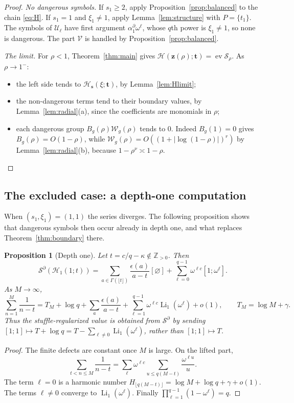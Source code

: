 \documentclass[11pt]{amsart}
\newtheorem{proposition}[theorem]{Proposition}
\theoremstyle{definition}
\theoremstyle{remark}
\numberwithin{equation}{section}
\newcommand{\Z}{\mathbb{Z}}
\newcommand{\Li}{\operatorname{Li}}
\newcommand{\ev}{\operatorname{ev}}
\newcommand{\cS}{\mathcal{S}}
\newcommand{\s}{\mathbf{s}}
\newcommand{\z}{\mathbf{z}}
\newcommand{\tb}{\mathbf{t}}
\newcommand{\Hs}{\mathcal{H}}
\newcommand{\lfl}{\lfloor}
\newcommand{\rfl}{\rfloor}
\begin{document}
\begin{proof}
\emph{No dangerous symbols.} If $s_1\ge2$, apply Proposition~\ref{prop:balanced} to the chain \eqref{eq:H}. If $s_1=1$ and $\xi_1\ne1$, apply Lemma~\ref{lem:structure} with $P=\{t_1\}$. The symbols of $\mathcal U_\ell$ have first argument $\alpha_1^\partial\omega^\ell$, whose $q$th power is $\xi_1\ne1$, so none is dangerous. The part $\mathcal V$ is handled by Proposition~\ref{prop:balanced}.

\emph{The limit.} For $\rho<1$, Theorem~\ref{thm:main} gives $\Hs(\z(\rho);\tb)=\ev\cS_\rho$. As $\rho\to1^-$:
\begin{itemize}[leftmargin=1.5em]
\item the left side tends to $\Hs_\s(\xi;\tb)$, by Lemma~\ref{lem:Hlimit};
\item the non-dangerous terms tend to their boundary values, by Lemma~\ref{lem:radial}(a), since the coefficients are monomials in $\rho$;
\item each dangerous group $B_g(\rho)\mathcal W_g(\rho)$ tends to $0$. Indeed $B_g(1)=0$ gives $B_g(\rho)=O(1-\rho)$, while $\mathcal W_g(\rho)=O((1+|\log(1-\rho)|)^r)$ by Lemma~\ref{lem:radial}(b), because $1-\rho^\nu\asymp1-\rho$. \qedhere
\end{itemize}
\end{proof}

\subsection{The excluded case: a depth-one computation}
When $(s_1,\xi_1)=(1,1)$ the series diverges. The following proposition shows that dangerous symbols then occur already in depth one, and what replaces Theorem~\ref{thm:boundary} there.

\begin{proposition}[Depth one]\label{prop:reg1}
Let $t=c/q-\kappa\notin\Z_{>0}$. Then
\[
\cS^\partial(\Hs_1(1;t))=\sum_{a\in\Gamma(\lfl t\rfl)}\frac{\epsilon(a)}{a-t}[\varnothing]+\sum_{\ell=0}^{q-1}\omega^{\ell c}[1;\omega^\ell].
\]
As $M\to\infty$,
\[
\sum_{n=1}^{M}\frac1{n-t}=T_M+\log q+\sum_{a}\frac{\epsilon(a)}{a-t}+\sum_{\ell=1}^{q-1}\omega^{\ell c}\Li_1(\omega^\ell)+o(1),\qquad T_M=\log M+\gamma .
\]
Thus the stuffle-regularized value is obtained from $\cS^\partial$ by sending $[1;1]\mapsto T+\log q=T-\sum_{\ell\ne0}\Li_1(\omega^\ell)$, rather than $[1;1]\mapsto T$.
\end{proposition}

\begin{proof}
The finite defects are constant once $M$ is large. On the lifted part,
\[
\sum_{t<n\le M}\frac{1}{n-t}=\sum_{\ell}\omega^{\ell c}\sum_{u\le q(M-t)}\frac{\omega^{\ell u}}{u}.
\]
The term $\ell=0$ is a harmonic number $H_{\lfl q(M-t)\rfl}=\log M+\log q+\gamma+o(1)$. The terms $\ell\ne0$ converge to $\Li_1(\omega^\ell)$. Finally $\prod_{\ell=1}^{q-1}(1-\omega^\ell)=q$.
\end{proof}
\end{document}
